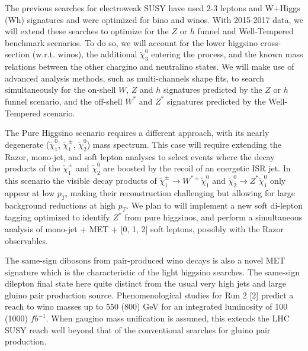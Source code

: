 The previous searches for electroweak SUSY have used 2-3 leptons and
W+Higgs (Wh) signatures\cite{DG} and were optimized for bino and
winos. With 2015-2017 data, we will extend these searches to optimize
for the $Z$ or $h$ funnel and Well-Tempered benchmark scenarios. To do
so, we will account for the lower higgsino cross-section
(w.r.t. winos), the additional $\tilde{\chi}_3^0$ entering the
process, and the known mass relations between the other chargino and
neutralino states.  We will make use of advanced analysis methods,
such as multi-channels shape fits, to search simultaneously for the
on-shell $W$, $Z$ and $h$ signatures predicted by the $Z$ or $h$ funnel
scenario, and the off-shell $W^*$ and $Z^*$ signatures predicted by
the Well-Tempered scenario.  


The Pure Higgsino scenario requires a different approach, with its
nearly degenerate ($\tilde{\chi}_1^0$, $\tilde{\chi}_1^\pm$,
$\tilde{\chi}_2^0$) mass spectrum. This case will require extending
the Razor, mono-jet, and soft lepton analyses\cite{Mono,Mono2} to select
events where the decay products of the $\tilde{\chi}_1^\pm$ and
$\tilde{\chi}_2^0$ are boosted by the recoil of an energetic ISR jet.
In this scenario the visible decay products
of $\tilde{\chi}_1^\pm\rightarrow W^{*\pm}\tilde{\chi}_1^0$ and
$\tilde{\chi}_2^0\rightarrow Z^{*}\tilde{\chi}_1^0$ only appear at
low $p_T$, making their reconstruction challenging but allowing for
large background reductions at high $p_T$.  We plan to will implement
a new soft di-lepton tagging optimized to identify $Z^{*}$ from pure
higgsinos, and perform a simultaneous analysis of mono-jet + MET + [0,
1, 2] soft leptons, possibly with the Razor observables.

The same-sign dibosons from pair-produced wino decays is also a novel
MET signature which is the characteristic of the light higgsino
searches.
The same-sign dilepton final state here quite distinct from the usual
very high \pt jets and large \met gluino pair production source.
Phenomenological studies for Run 2 [2] predict a reach to
wino masses up to 550 (800) GeV for an integrated luminosity of 100
(1000) $fb^{-1}$. When gaugino mass unification is assumed, this extends
the LHC SUSY reach well beyond that of the conventional searches for
gluino pair production.

